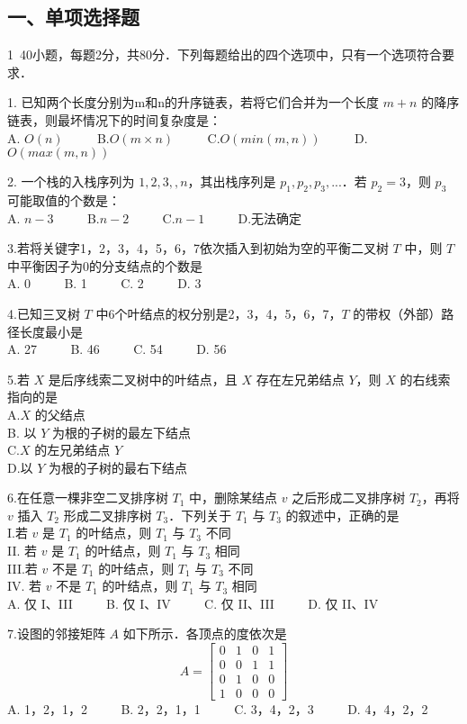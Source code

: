 
\subsection{一、单项选择题}
1~40小题，每题2分，共80分．下列每题给出的四个选项中，只有一个选项符合要求．

1. 已知两个长度分别为m和n的升序链表，若将它们合并为一个长度 $m+n$ 的降序链表，则最坏情况下的时间复杂度是： \\
A. $O(n)$ $\qquad$ B.$O(m \times n)$ $\qquad$ C.$O(min(m,n))$ $\qquad$ D.$O(max(m,n))$

2. 一个栈的入栈序列为 $1,2,3,,n$，其出栈序列是 $p_1, p_2, p_3, ...$．若 $p_2=3$，则 $p_3$ 可能取值的个数是： \\
A. $n-3$  $\qquad$  B.$n-2$ $\qquad$ C.$n-1$ $\qquad$ D.无法确定

3.若将关键字1，2，3，4，5，6，7依次插入到初始为空的平衡二叉树 $T$ 中，则 $T$ 中平衡因子为0的分支结点的个数是 \\
   A. 0 $\qquad$ B. 1 $\qquad$ C. 2 $\qquad$ D. 3

4.已知三叉树 $T$ 中6个叶结点的权分别是2，3，4，5，6，7，$T$ 的带权（外部）路径长度最小是 \\
   A. 27 $\qquad$ B. 46 $\qquad$ C. 54 $\qquad$ D. 56 

5.若 $X$ 是后序线索二叉树中的叶结点，且 $X$ 存在左兄弟结点 $Y$，则 $X$ 的右线索指向的是 \\
A.$X$ 的父结点 \\
B. 以 $Y$ 为根的子树的最左下结点 \\
C.$X$ 的左兄弟结点 $Y$ \\
D.以 $Y$ 为根的子树的最右下结点

6.在任意一棵非空二叉排序树 $T_1$ 中，删除某结点 $v$ 之后形成二叉排序树 $T_2$，再将 $v$ 插入 $T_2$ 形成二叉排序树 $T_3$．下列关于 $T_1$ 与 $T_3$ 的叙述中，正确的是  \\
I.若 $v$ 是 $T_1$ 的叶结点，则 $T_1$ 与 $T_3$ 不同 \\
II.	若 $v$ 是 $T_1$ 的叶结点，则 $T_1$ 与 $T_3$ 相同 \\
III.若 $v$ 不是 $T_1$ 的叶结点，则 $T_1$ 与 $T_3$ 不同 \\
IV.	若 $v$ 不是 $T_1$ 的叶结点，则 $T_1$ 与 $T_3$ 相同 \\
A. 仅 I、III $\qquad$ B. 仅 I、IV $\qquad$ C. 仅 II、III $\qquad$ D. 仅 II、IV

7.设图的邻接矩阵 $A$ 如下所示．各顶点的度依次是 \\
\begin{equation}
A=\begin{bmatrix}
0 & 1 & 0 & 1 \\
0 & 0 & 1 & 1 \\
0 & 1 & 0 & 0 \\
1 & 0 & 0 & 0
\end{bmatrix}
\end{equation}
A. 1，2，1，2 $\qquad$ B. 2，2，1，1 $\qquad$ C. 3，4，2，3 $\qquad$ D. 4，4，2，2

